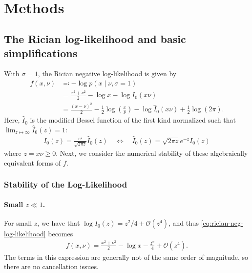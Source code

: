 \documentclass{article}
\begin{document}
\section{Methods}

\subsection{The Rician log-likelihood and basic simplifications}\label{sec:rician-log-likelihood-and-basic-simplifications}

With $\sigma=1$, the Rician negative log-likelihood is given by
%
\begin{align}
  f(x, \nu) & \eqqcolon -\log p(x \mid \nu, \sigma=1)                                                                                                                        \\
            & = \frac{x^2 + \nu^2}{2} - \log x - \log I_0(x \nu) \label{eq:rician-neg-log-likelihood}                                                                        \\
            & = \frac{(x-\nu)^2}{2} - \frac{1}{2}\log\left(\frac{x}{\nu}\right) - \log \hat{I}_0(x \nu) + \frac{1}{2}\log(2\pi). \label{eq:rician-neg-log-likelihood-scaled}
\end{align}
%
Here, $\hat{I}_0$ is the modified Bessel function of the first kind normalized such that $\lim_{z \mapsto \infty} \hat{I}_0(z) = 1$:
%
\begin{align}
  I_0(z) = \frac{e^z}{\sqrt{2\pi z}} \hat{I}_0(z) \quad \Leftrightarrow \quad \hat{I}_0(z) = \sqrt{2\pi z} e^{-z} I_0(z)
\end{align}
%
where $z = x\nu \ge 0$.
Next, we consider the numerical stability of these algebraically equivalent forms of $f$.

\subsubsection{Stability of the Log-Likelihood}

\paragraph{Small $z \ll 1$.}

For small $z$, we have that $\log I_0(z) = z^2/4 + \mathcal{O}(z^4)$, and thus \cref{eq:rician-neg-log-likelihood} becomes
%
\begin{align}
  f(x, \nu) = \frac{x^2 + \nu^2}{2} - \log x - \frac{z^2}{4} + \mathcal{O}(z^4).
\end{align}
%
The terms in this expression are generally not of the same order of magnitude, so there are no cancellation issues.
\end{document}
